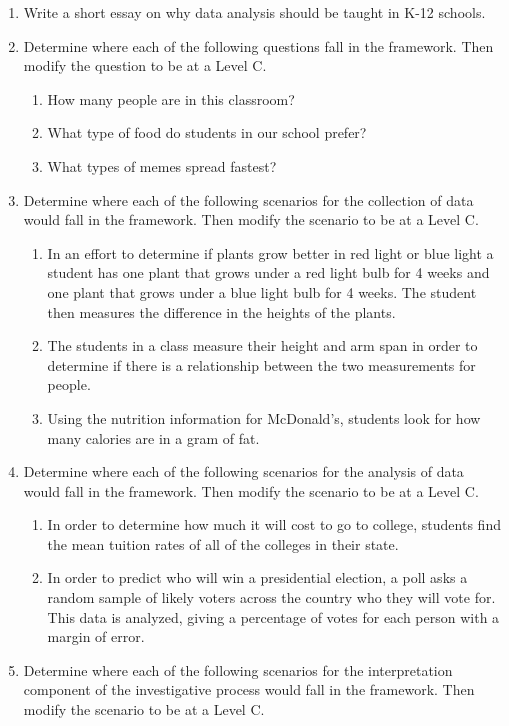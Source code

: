 \documentclass[
]{book}
\providecommand{\tightlist}{%
  \setlength{\itemsep}{0pt}\setlength{\parskip}{0pt}}
\theoremstyle{definition}
\theoremstyle{definition}
\theoremstyle{definition}
\theoremstyle{definition}
\theoremstyle{remark}
\begin{document}
\begin{enumerate}
\def\labelenumi{\arabic{enumi}.}
\item
  Write a short essay on why data analysis should be taught in K-12 schools.
\item
  Determine where each of the following questions fall in the framework. Then modify the question to be at a Level C.

  \begin{enumerate}
  \def\labelenumii{\alph{enumii}.}
  \tightlist
  \item
    How many people are in this classroom?
  \item
    What type of food do students in our school prefer?
  \item
    What types of memes spread fastest?
  \end{enumerate}
\item
  Determine where each of the following scenarios for the collection of data would fall in the framework. Then modify the scenario to be at a Level C.

  \begin{enumerate}
  \def\labelenumii{\alph{enumii}.}
  \tightlist
  \item
    In an effort to determine if plants grow better in red light or blue light a student has one plant that grows under a red light bulb for 4 weeks and one plant that grows under a blue light bulb for 4 weeks. The student then measures the difference in the heights of the plants.
  \item
    The students in a class measure their height and arm span in order to determine if there is a relationship between the two measurements for people.
  \item
    Using the nutrition information for McDonald's, students look for how many calories are in a gram of fat.
  \end{enumerate}
\item
  Determine where each of the following scenarios for the analysis of data would fall in the framework. Then modify the scenario to be at a Level C.

  \begin{enumerate}
  \def\labelenumii{\alph{enumii}.}
  \tightlist
  \item
    In order to determine how much it will cost to go to college, students find the mean tuition rates of all of the colleges in their state.
  \item
    In order to predict who will win a presidential election, a poll asks a random sample of likely voters across the country who they will vote for. This data is analyzed, giving a percentage of votes for each person with a margin of error.
  \end{enumerate}
\item
  Determine where each of the following scenarios for the interpretation component of the investigative process would fall in the framework. Then modify the scenario to be at a Level C.


\end{enumerate}
\end{document}
